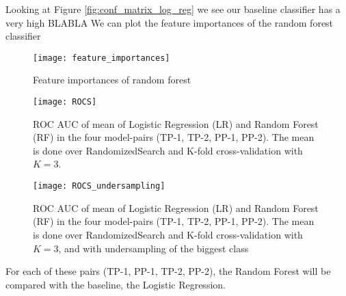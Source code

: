 Looking at Figure \ref{fig:conf_matrix_log_reg} we see our baseline classifier has a very high BLABLA
We can plot the feature importances of the random forest classifier
\begin{figure}[H]
    \hspace*{-1.0cm}
    \centering
    \texttt{[image: feature\_importances]}
    \caption{Feature importances of random forest}
    \label{fig:feature_importances}
\end{figure}

\begin{figure}[H]
    \hspace*{-1.0cm}
    \centering
    \texttt{[image: ROCS]}
    \caption{ROC AUC of mean of Logistic Regression (LR) and Random Forest (RF) in the four model-pairs (TP-1, TP-2, PP-1, PP-2). The mean is done over RandomizedSearch and K-fold cross-validation with $K=3$. }
    \label{fig:rocs}
\end{figure}
\begin{figure}[H]
    \hspace*{-1.0cm}
    \centering
    \texttt{[image: ROCS\_undersampling]}
    \caption{ROC AUC of mean of Logistic Regression (LR) and Random Forest (RF) in the four model-pairs (TP-1, TP-2, PP-1, PP-2). The mean is done over RandomizedSearch and K-fold cross-validation with $K=3$, and with undersampling of the biggest class}
    \label{fig:rocs_undersampling}
\end{figure}
For each of these pairs (TP-1, PP-1, TP-2, PP-2), the Random Forest will be compared with the baseline, the Logistic Regression. 


